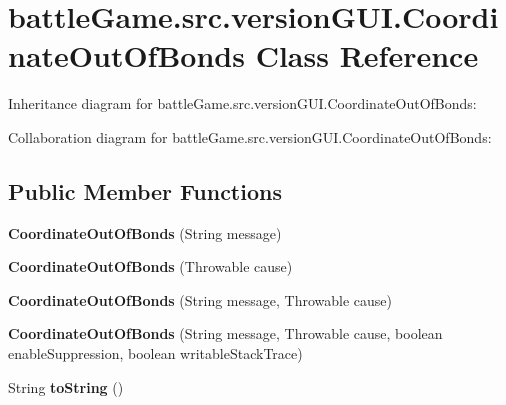 \hypertarget{classbattleGame_1_1src_1_1versionGUI_1_1CoordinateOutOfBonds}{}\section{battle\+Game.\+src.\+version\+G\+U\+I.\+Coordinate\+Out\+Of\+Bonds Class Reference}
\label{classbattleGame_1_1src_1_1versionGUI_1_1CoordinateOutOfBonds}


Inheritance diagram for battle\+Game.\+src.\+version\+G\+U\+I.\+Coordinate\+Out\+Of\+Bonds\+:


Collaboration diagram for battle\+Game.\+src.\+version\+G\+U\+I.\+Coordinate\+Out\+Of\+Bonds\+:
\subsection*{Public Member Functions}
\begin{DoxyCompactItemize}
\item 
{\bfseries Coordinate\+Out\+Of\+Bonds} (String message)\hypertarget{classbattleGame_1_1src_1_1versionGUI_1_1CoordinateOutOfBonds_acb0225030b988b3e3b9535df69522731}{}\label{classbattleGame_1_1src_1_1versionGUI_1_1CoordinateOutOfBonds_acb0225030b988b3e3b9535df69522731}

\item 
{\bfseries Coordinate\+Out\+Of\+Bonds} (Throwable cause)\hypertarget{classbattleGame_1_1src_1_1versionGUI_1_1CoordinateOutOfBonds_aaf2761724194587a97074c21933aa6ec}{}\label{classbattleGame_1_1src_1_1versionGUI_1_1CoordinateOutOfBonds_aaf2761724194587a97074c21933aa6ec}

\item 
{\bfseries Coordinate\+Out\+Of\+Bonds} (String message, Throwable cause)\hypertarget{classbattleGame_1_1src_1_1versionGUI_1_1CoordinateOutOfBonds_a59be873a7ddd7f8a1b79288ba7590da0}{}\label{classbattleGame_1_1src_1_1versionGUI_1_1CoordinateOutOfBonds_a59be873a7ddd7f8a1b79288ba7590da0}

\item 
{\bfseries Coordinate\+Out\+Of\+Bonds} (String message, Throwable cause, boolean enable\+Suppression, boolean writable\+Stack\+Trace)\hypertarget{classbattleGame_1_1src_1_1versionGUI_1_1CoordinateOutOfBonds_ae79cdc2367cc932a941af2850310a2a9}{}\label{classbattleGame_1_1src_1_1versionGUI_1_1CoordinateOutOfBonds_ae79cdc2367cc932a941af2850310a2a9}

\item 
String {\bfseries to\+String} ()\hypertarget{classbattleGame_1_1src_1_1versionGUI_1_1CoordinateOutOfBonds_a0c356ef57d5548724071967e95865c9a}{}\label{classbattleGame_1_1src_1_1versionGUI_1_1CoordinateOutOfBonds_a0c356ef57d5548724071967e95865c9a}

\end{DoxyCompactItemize}


